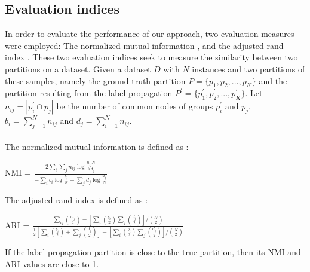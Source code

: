 \documentclass[conference]{IEEEtran}
\begin{document}
\subsection{Evaluation indices}
In order to evaluate the performance of our approach, two evaluation measures were employed: The normalized mutual information \cite{dom2012information}, and the adjusted rand index \cite{hubert1985comparing}. These two evaluation indices seek to measure the similarity between two partitions on a dataset. Given a dataset $D$ with $N$ instances and two partitions of these samples, namely the ground-truth partition $P= \{p_1, p_2,..., p_K\}$ and the  partition resulting from the label propagation $P^{'}=\{p_1^{'},p_2^{'},...,p_K^{'}\}$. Let $n_{ij} = |p_i^{'} \cap p_j|$ be the number of common nodes of groups $p_i^{'}$ and $p_j$, $b_i = \sum_{j=1}^N n_{ij}$ and $d_j = \sum_{i=1}^N n_{ij}$.
\\
\\ The normalized mutual information is defined as :
\begin{center}
    NMI = $\frac{2 \sum_i \sum_j n_{ij} \log \frac{n_{ij}N}{b_id_j} }{-\sum_i b_i\log \frac{b_i}{N} -\sum_j  d_j \log \frac{d_j}{N}}$
\end{center}
The adjusted rand index is defined as :
\begin{center}
    ARI = $\frac{\sum_{ij} \binom{n_{ij}}{2} - [\sum_i \binom{b_{i}}{2}\sum_j \binom{d_{j}}{2}]/\binom{N}{2}}{\frac{1}{2}[\sum_i \binom{b_{i}}{2} + \sum_j \binom{d_{j}}{2}]-[\sum_i \binom{b_{i}}{2}\sum_j \binom{d_{j}}{2}]/\binom{N}{2}}$
\end{center}
If the label propagation partition is close to the true partition, then its NMI and ARI values are close to 1.
\end{document}
